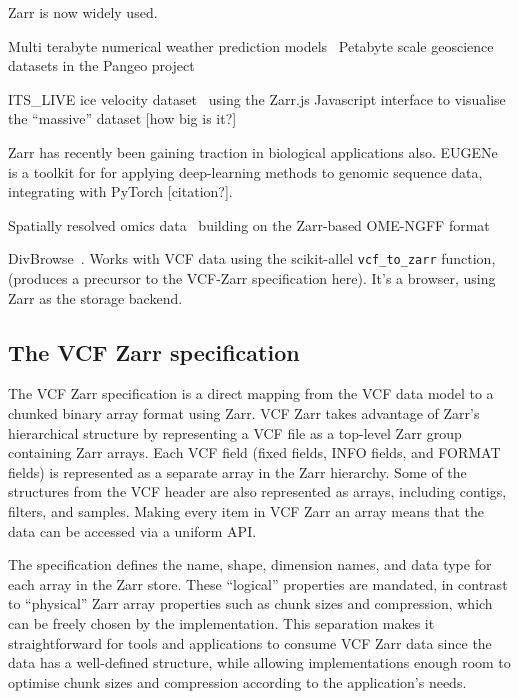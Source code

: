 \documentclass[a4paper,num-refs]{oup-contemporary}
\begin{document}
Zarr is now widely used.

Multi terabyte numerical weather prediction models~\citep{gowan2022using}
Petabyte scale geoscience datasets in the Pangeo project

ITS\_LIVE ice velocity dataset~\citep{fahnestock2023mappin} using 
the Zarr.js Javascript interface to visualise the ``massive''
dataset [how big is it?]

Zarr has recently been gaining traction in biological applications
also. EUGENe~\citep{klie2023predictive} is a toolkit for 
for applying deep-learning methods to genomic sequence data,
integrating with PyTorch [citation?].

Spatially resolved omics data~\citep{baker2023emobject,marconato2024spatialdata}
building on the Zarr-based OME-NGFF format~\citep{moore2023ome,rzepka2023toward}

DivBrowse~\citep{konig2023divbrowse}. Works with VCF data using 
the scikit-allel \texttt{vcf\_to\_zarr} function, (produces 
a precursor to the VCF-Zarr specification here). It's a 
browser, using Zarr as the storage backend.

\subsection{The VCF Zarr specification}
The VCF Zarr specification is a direct mapping from the VCF data model
to a chunked binary array format using Zarr. VCF Zarr takes advantage
of Zarr's hierarchical structure by representing a VCF file as a top-level
Zarr group containing Zarr arrays. Each VCF field (fixed fields, INFO fields,
and FORMAT fields) is represented as a separate array in the Zarr hierarchy.
Some of the structures from the VCF header are also represented as arrays,
including contigs, filters, and samples. Making every item in VCF Zarr an
array means that the data can be accessed via a uniform API.


The specification defines the name, shape, dimension names, and data type
for each array in the Zarr store. These ``logical'' properties are mandated,
in contrast to ``physical'' Zarr array properties such as chunk sizes and
compression, which can be freely chosen by the implementation. This
separation makes it straightforward for tools and applications to consume
VCF Zarr data since the data has a well-defined structure, while allowing
implementations enough room to optimise chunk sizes and compression
according to the application's needs.
\end{document}
